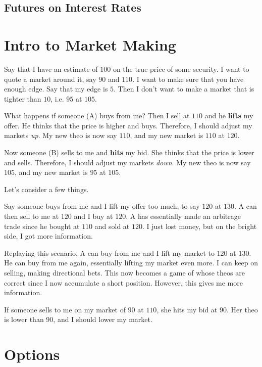 \documentclass{article}
\begin{document}
  \subsection{Futures on Interest Rates}

\section{Intro to Market Making}

  Say that I have an estimate of $100$ on the true price of some security.
  I want to quote a market around it, say $90$ and $110$.
  I want to make sure that you have enough edge.
  Say that my edge is $5$.
  Then I don't want to make a market that is tighter than $10$, i.e. $95$ at $105$.

  What happens if someone (A) buys from me?
  Then I sell at $110$ and he \textbf{lifts} my offer.
  He thinks that the price is higher and buys.
  Therefore, I should adjust my markets \textit{up}.
  My new theo is now say $110$, and my new market is $110$ at $120$.

  Now someone (B) sells to me and \textbf{hits} my bid.
  She thinks that the price is lower and sells.
  Therefore, I should adjust my markets \textit{down}.
  My new theo is now say $105$, and my new market is $95$ at $105$.

  Let's consider a few things.

  Say someone buys from me and I lift my offer too much, to say $120$ at $130$.
  A can then sell to me at $120$ and I buy at $120$.
  A has essentially made an arbitrage trade since he bought at $110$ and sold at $120$.
  I just lost money, but on the bright side, I got more information.

  Replaying this scenario, A can buy from me and I lift my market to $120$ at $130$.
  He can buy from me again, essentially lifting my market even more.
  I can keep on selling, making directional bets.
  This now becomes a game of whose theos are correct since I now accumulate a short position.
  However, this gives me more information.

  If someone sells to me on my market of $90$ at $110$, she hits my bid at $90$.
  Her theo is lower than 90, and I should lower my market.

\section{Options}
\end{document}

